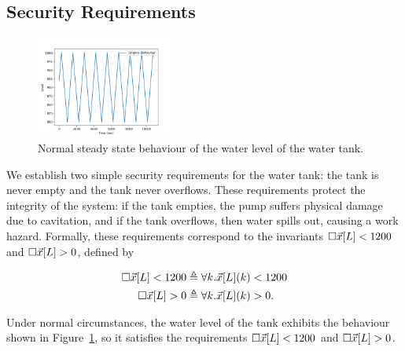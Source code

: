 \subsection*{Security Requirements}
\begin{figure} 
  \vspace{-1cm}
  \centering
  \includegraphics[width=0.4\textwidth]{Figures/Stage3Normal.png}
  \vspace{-0.25cm}
  \caption{Normal steady state behaviour of the water level of the water tank.}
  \label{fig:Stage3Normal}
  \vspace{-1cm}
\end{figure} 
We establish two simple security requirements for the water tank: the tank is never empty and the tank never overflows. These requirements protect the integrity of the system: if the tank empties, the pump suffers physical damage due to cavitation, and if the tank overflows, then water spills out, causing a work hazard. Formally, these requirements correspond to the invariants ${{\square}}{\vec{x}[L]< 1200}$ and ${{\square}}{\vec{x}[L]> 0}$, defined by
\begin{minipage}{0.5\textwidth}
  \begin{align*}
    {{\square}}{\vec{x}[L]< 1200}&\triangleq \forall k.\vec{x}[L](k)< 1200\\
    {{\square}}{\vec{x}[L]> 0}&\triangleq \forall k.\vec{x}[L](k)> 0.
  \end{align*}
\end{minipage}

Under normal circumstances, the water level of the tank exhibits the behaviour shown in Figure~\ref{fig:Stage3Normal}, so it satisfies the requirements ${{\square}}{\vec{x}[L]< 1200}$ and ${{\square}}{\vec{x}[L]> 0}$.
